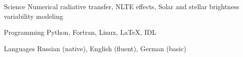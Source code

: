 

\begin{cvskills}

  \cvskill
    {Science} %
    {Numerical radiative transfer, NLTE effects, Solar and stellar brightness variability modeling} %

  \cvskill
    {Programming} %
    {Python, Fortran, Linux, LaTeX, IDL} %

  \cvskill
    {Languages} %
    {Russian (native), English (fluent), German (basic)} %

\end{cvskills}
